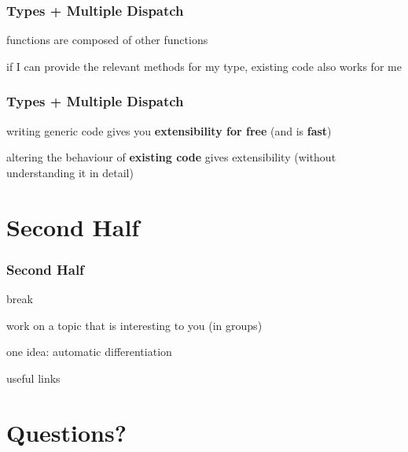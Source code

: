 \documentclass[notes]{beamer}
\newenvironment{wideitemize}{
    \itemize\addtolength{\itemsep}{15pt}\addtolength{\topsep}{10pt}}{\enditemize}
\begin{document}
    \begin{frame}
    \frametitle{Types + Multiple Dispatch}
    \vspace{1cm}
        \begin{wideitemize}
            \item functions are composed of other functions
            \item if I can provide the relevant methods for my type, existing code also works for me
        \end{wideitemize}
        \vspace{1cm}
    \end{frame}

    \begin{frame}
    \frametitle{Types + Multiple Dispatch}
    \vspace{1cm}
        \begin{wideitemize}
            \item writing generic code gives you \textbf{extensibility for free} (and is \textbf{fast})
            \item altering the behaviour of \textbf{existing code} gives extensibility (without understanding it in detail)
        \end{wideitemize}
    \end{frame}


    \section{Second Half}

    \begin{frame}
    \frametitle{Second Half}
    \vspace{1cm}
        \begin{wideitemize}
            \item break
            \item work on a topic that is interesting to you (in groups)
            \item one idea: automatic differentiation
            \item useful links
        \end{wideitemize}
    \end{frame}

	\section{Questions?}
\end{document}
